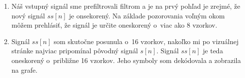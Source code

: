 \documentclass[10pt, a4paper, twocolumn]{article}
\begin{document}
\begin{enumerate}[leftmargin=*]
\item Náš vstupný signál sme prefiltrovali filtrom a je na prvý pohľad je zrejmé, že nový signál $ss[n]$ je onsekorený. Na základe pozorovania voľným okom môžem prehlásiť, že signál je určite oneskorený o~viac ako 8 vzorkov.
\begin{figure}[H]
\centering
{}
\end{figure}

\item Signál $ss[n]$ som skutočne posunula o~16 vzorkov, nakoľko mi po vizuálnej stránke najviac pripomínal pôvodný signál $s[n]$. Signál $ss[n]$ je teda oneskorený o~približne 16 vzorkov. Jeho symboly som dekódovala a zobrazila na grafe.
\begin{figure}[H]
\centering
{}
\end{figure}


\end{enumerate}
\end{document}
